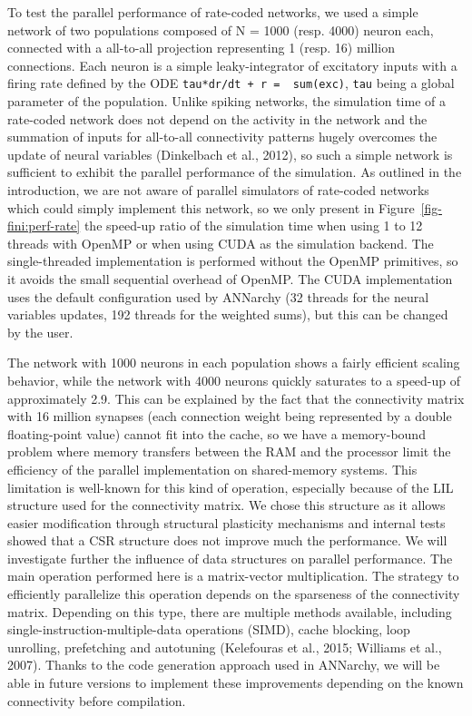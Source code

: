 \documentclass[
  11pt,
  a4paper,
]{scrbook}
\begin{document}
To test the parallel performance of rate-coded networks, we used a
simple network of two populations composed of N = 1000 (resp. 4000)
neuron each, connected with a all-to-all projection representing 1
(resp. 16) million connections. Each neuron is a simple leaky-integrator
of excitatory inputs with a firing rate defined by the ODE
\texttt{tau*dr/dt\ +\ r\ =\ \ sum(exc)}, \texttt{tau} being a global
parameter of the population. Unlike spiking networks, the simulation
time of a rate-coded network does not depend on the activity in the
network and the summation of inputs for all-to-all connectivity patterns
hugely overcomes the update of neural variables (Dinkelbach et al.,
2012), so such a simple network is sufficient to exhibit the parallel
performance of the simulation. As outlined in the introduction, we are
not aware of parallel simulators of rate-coded networks which could
simply implement this network, so we only present in
Figure~\ref{fig-fini:perf-rate} the speed-up ratio of the simulation
time when using 1 to 12 threads with OpenMP or when using CUDA as the
simulation backend. The single-threaded implementation is performed
without the OpenMP primitives, so it avoids the small sequential
overhead of OpenMP. The CUDA implementation uses the default
configuration used by ANNarchy (32 threads for the neural variables
updates, 192 threads for the weighted sums), but this can be changed by
the user.

The network with 1000 neurons in each population shows a fairly
efficient scaling behavior, while the network with 4000 neurons quickly
saturates to a speed-up of approximately 2.9. This can be explained by
the fact that the connectivity matrix with 16 million synapses (each
connection weight being represented by a double floating-point value)
cannot fit into the cache, so we have a memory-bound problem where
memory transfers between the RAM and the processor limit the efficiency
of the parallel implementation on shared-memory systems. This limitation
is well-known for this kind of operation, especially because of the LIL
structure used for the connectivity matrix. We chose this structure as
it allows easier modification through structural plasticity mechanisms
and internal tests showed that a CSR structure does not improve much the
performance. We will investigate further the influence of data
structures on parallel performance. The main operation performed here is
a matrix-vector multiplication. The strategy to efficiently parallelize
this operation depends on the sparseness of the connectivity matrix.
Depending on this type, there are multiple methods available, including
single-instruction-multiple-data operations (SIMD), cache blocking, loop
unrolling, prefetching and autotuning (Kelefouras et al., 2015; Williams
et al., 2007). Thanks to the code generation approach used in ANNarchy,
we will be able in future versions to implement these improvements
depending on the known connectivity before compilation.
\end{document}
